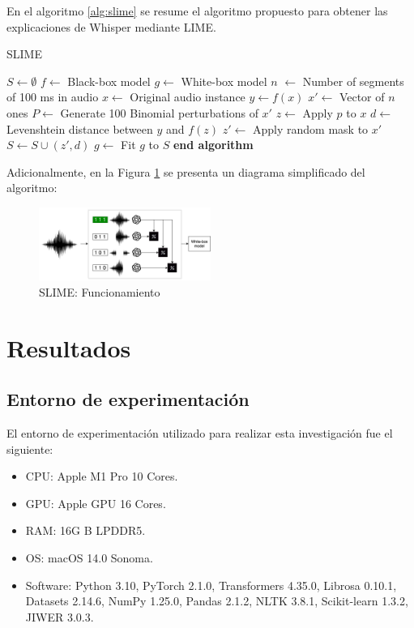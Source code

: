 \documentclass[conference]{IEEEtran}
\begin{document}
En el algoritmo \ref{alg:slime} se resume el algoritmo propuesto para obtener las explicaciones de Whisper mediante LIME.

\begin{algorithm}[H]
\caption{SLIME}
\begin{algorithmic}[1]
\State $S \gets \emptyset$
\State $f \gets$ Black-box model
\State $g \gets $ White-box model
\State $n$ $\gets$ Number of segments of 100 ms in audio
\State $x \gets$ Original audio instance
\State $y \gets f(x)$
\State $x' \gets$ Vector of $n$ ones
\State $P \gets$ Generate 100 Binomial perturbations of $x'$
    \State $z \gets$ Apply $p$ to $x$
    \State $d \gets$  Levenshtein distance between $y$ and $f(z)$
    \State $z' \gets$ Apply random mask to $x'$
    \State $S \gets S \cup (z', d)$
\EndFor
\State $g \gets$ Fit $g$ to $S$
\State \textbf{end algorithm}
\end{algorithmic}
\label{alg:slime}
\end{algorithm}

Adicionalmente, en la Figura \ref{fig:diagram} se presenta un diagrama simplificado del algoritmo:

\begin{figure}[ht]
\centerline{\includegraphics[width=0.5\textwidth]{./images/diagram.png}}
\caption{SLIME: Funcionamiento}
\label{fig:diagram}
\end{figure}


\section{Resultados} \label{6-Results}

\subsection{Entorno de experimentación}
El entorno de experimentación utilizado para realizar esta investigación fue el siguiente:
\begin{itemize}
    \item CPU: Apple M1 Pro 10 Cores.
    \item GPU: Apple GPU 16 Cores.
    \item RAM: 16G B LPDDR5.
    \item OS: macOS 14.0 Sonoma.
    \item Software: Python 3.10, PyTorch 2.1.0, Transformers 4.35.0, Librosa 0.10.1, Datasets 2.14.6, NumPy 1.25.0, Pandas 2.1.2, NLTK 3.8.1, Scikit-learn 1.3.2, JIWER 3.0.3.
\end{itemize}
\end{document}
